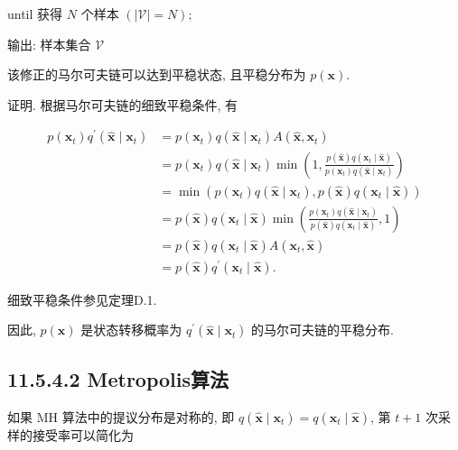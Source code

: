 \documentclass[10pt]{article}
\begin{document}
until 获得 $N$ 个样本 $(|\mathcal{V}|=N)$;

输出: 样本集合 $\mathcal{V}$

该修正的马尔可夫链可以达到平稳状态, 且平稳分布为 $p(\boldsymbol{x})$.

证明. 根据马尔可夫链的细致平稳条件, 有


\begin{align*}
p\left(\boldsymbol{x}_{t}\right) q^{\prime}\left(\hat{\boldsymbol{x}} \mid \boldsymbol{x}_{t}\right) & =p\left(\boldsymbol{x}_{t}\right) q\left(\hat{\boldsymbol{x}} \mid \boldsymbol{x}_{t}\right) A\left(\hat{\boldsymbol{x}}, \boldsymbol{x}_{t}\right)  \tag{11.109}\\
& =p\left(\boldsymbol{x}_{t}\right) q\left(\hat{\boldsymbol{x}} \mid \boldsymbol{x}_{t}\right) \min \left(1, \frac{p(\hat{\boldsymbol{x}}) q\left(\boldsymbol{x}_{t} \mid \hat{\boldsymbol{x}}\right)}{p\left(\boldsymbol{x}_{t}\right) q\left(\hat{\boldsymbol{x}} \mid \boldsymbol{x}_{t}\right)}\right)  \tag{11.110}\\
& =\min \left(p\left(\boldsymbol{x}_{t}\right) q\left(\hat{\boldsymbol{x}} \mid \boldsymbol{x}_{t}\right), p(\hat{\boldsymbol{x}}) q\left(\boldsymbol{x}_{t} \mid \hat{\boldsymbol{x}}\right)\right)  \tag{11.111}\\
& =p(\hat{\boldsymbol{x}}) q\left(\boldsymbol{x}_{t} \mid \hat{\boldsymbol{x}}\right) \min \left(\frac{p\left(\boldsymbol{x}_{t}\right) q\left(\hat{\boldsymbol{x}} \mid \boldsymbol{x}_{t}\right)}{p(\hat{\boldsymbol{x}}) q\left(\boldsymbol{x}_{t} \mid \hat{\boldsymbol{x}}\right)}, 1\right)  \tag{11.112}\\
& =p(\hat{\boldsymbol{x}}) q\left(\boldsymbol{x}_{t} \mid \hat{\boldsymbol{x}}\right) A\left(\boldsymbol{x}_{t}, \hat{\boldsymbol{x}}\right)  \tag{11.113}\\
& =p(\hat{\boldsymbol{x}}) q^{\prime}\left(\boldsymbol{x}_{t} \mid \hat{\boldsymbol{x}}\right) . \tag{11.114}
\end{align*}


细致平稳条件参见定理D.1.

因此, $p(\boldsymbol{x})$ 是状态转移概率为 $q^{\prime}\left(\hat{\boldsymbol{x}} \mid \boldsymbol{x}_{t}\right)$ 的马尔可夫链的平稳分布.

\subsection*{11.5.4.2 Metropolis算法}
如果 MH 算法中的提议分布是对称的, 即 $q\left(\hat{\boldsymbol{x}} \mid \boldsymbol{x}_{t}\right)=q\left(\boldsymbol{x}_{t} \mid \hat{\boldsymbol{x}}\right)$, 第 $t+1$ 次采样的接受率可以简化为
\end{document}
